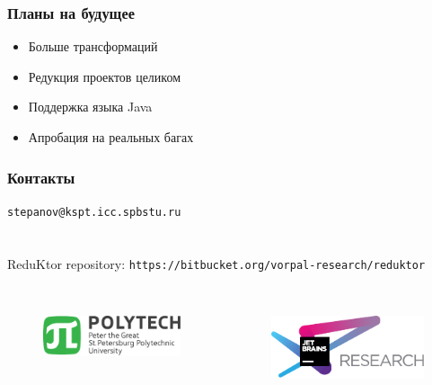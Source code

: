 \begin{frame}
	\frametitle{Планы на будущее}
	\begin{itemize}
		\item Больше трансформаций
		\item Редукция проектов целиком
		\item Поддержка языка Java
		\item Апробация на реальных багах
	\end{itemize}
\end{frame}


\begin{frame}[fragile]
\frametitle{Контакты}
\texttt{stepanov@kspt.icc.spbstu.ru} \\ \ \\ \ \\
ReduKtor repository: \texttt{https://bitbucket.org/vorpal-research/reduktor}
\\ \ \\ 
\begin{columns} 
	\begin{figure}
		\includegraphics[width=0.99\linewidth]{image/polytech_logo_en} 
	\end{figure}
	\begin{figure}
		\includegraphics[width=0.99\linewidth]{image/jetbrainsLogo} 
	\end{figure}
\end{columns}
\end{frame}
